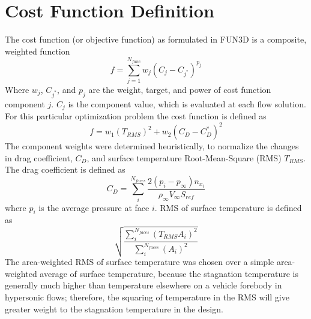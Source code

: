 \section{Cost Function Definition}

The cost function (or objective function) as formulated in FUN3D is a composite,
weighted function
\begin{equation}
  f = \sum_{j=1}^{N_{func}}w_j\left( C_j - C_{j^*} \right)^{p_j}
  \label{generic-cost-function}
\end{equation}
Where $w_j$, $C_{j^*}$, and $p_j$ are the weight, target, and power of cost
function component $j$.  $C_j$ is the component value, which is evaluated at
each flow solution.  For this particular optimization problem the cost function
is defined as 
\begin{equation}
  f = w_1\left( T_{RMS} \right)^{2} + w_2\left( C_{D} - C_{D}^{*} \right)^2
  \label{cd-tt-cost-function}
\end{equation}
The component weights were determined heuristically, to normalize the changes in
drag coefficient, $C_D$, and surface temperature Root-Mean-Square (RMS) $T_{RMS}$.
The drag coefficient is defined as
\begin{equation}
  C_D = \sum_{i}^{N_{faces}}
        \frac{2\left( p_i - p_\infty \right)n_{x_{i}}}
        {\rho_{\infty} V_{\infty}S_{ref}}
  \label{drag-coef-def}
\end{equation}
where $p_i$ is the average pressure at face $i$.  RMS of surface temperature is
defined as
\begin{equation}
  \sqrt{
    \frac{\sum_{i}^{N_{faces}}\left( T_{RMS} A_i \right)^2}
       {\sum_{i}^{N_{faces}}\left( A_i \right)^2}
     }
  \label{tt-rms-def}
\end{equation}
The area-weighted RMS of surface temperature was chosen over a simple
area-weighted average of surface temperature, because the stagnation temperature
is generally much higher than temperature elsewhere on a vehicle forebody in
hypersonic flows; therefore, the squaring of temperature in the RMS will give
greater weight to the stagnation temperature in the design.

